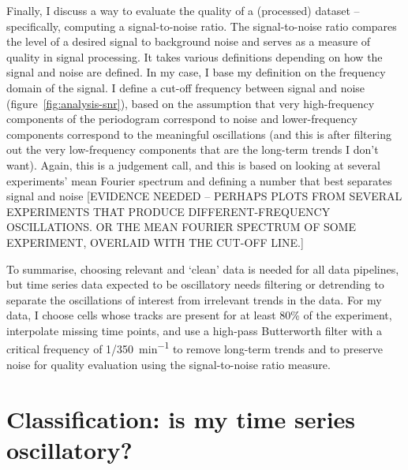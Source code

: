 Finally, I discuss a way to evaluate the quality of a (processed) dataset -- specifically, computing a signal-to-noise ratio.
The signal-to-noise ratio compares the level of a desired signal to background noise and serves as a measure of quality in signal processing.
It takes various definitions depending on how the signal and noise are defined.
In my case, I base my definition on the frequency domain of the signal.
I define a cut-off frequency between signal and noise (figure~\ref{fig:analysis-snr}), based on the assumption that very high-frequency components of the periodogram correspond to noise and lower-frequency components correspond to the meaningful oscillations (and this is after filtering out the very low-frequency components that are the long-term trends I don't want).
Again, this is a judgement call, and this is based on looking at several experiments' mean Fourier spectrum and defining a number that best separates signal and noise [EVIDENCE NEEDED -- PERHAPS PLOTS FROM SEVERAL EXPERIMENTS THAT PRODUCE DIFFERENT-FREQUENCY OSCILLATIONS.  OR THE MEAN FOURIER SPECTRUM OF SOME EXPERIMENT, OVERLAID WITH THE CUT-OFF LINE.]

To summarise, choosing relevant and `clean' data is needed for all data pipelines, but time series data expected to be oscillatory needs filtering or detrending to separate the oscillations of interest from irrelevant trends in the data.
For my data, I choose cells whose tracks are present for at least 80\% of the experiment, interpolate missing time points, and use a high-pass Butterworth filter with a critical frequency of \SI[parse-numbers=false]{1/350}{\minute^{-1}} to remove long-term trends and to preserve noise for quality evaluation using the signal-to-noise ratio measure.

\section{Classification: is my time series oscillatory?}
\label{sec:analysis-classification}

